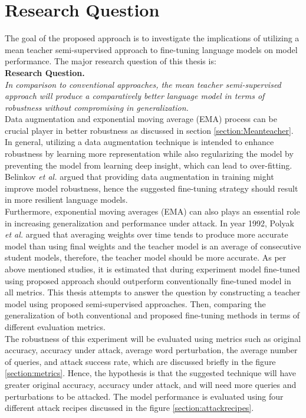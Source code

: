 \documentclass[%
	BCOR=8mm, %
	DIV=12,
	toc=bibliography, %
	toc=listof, %
	oneside, %
	egregdoesnotlikesansseriftitles, %
	]{scrbook}
\begin{document}
\section{Research Question}
\label{section:researchquestions}
The goal of the proposed approach is to investigate the implications of utilizing a mean teacher semi-supervised approach to fine-tuning language models on model performance.
The major research question of this thesis is: \\
\textbf{Research Question.}\\ \emph{In comparison to conventional approaches, the mean teacher semi-supervised approach will produce a comparatively better language model in terms of robustness without compromising in generalization.}\\
Data augmentation and exponential moving average (EMA) process can be crucial player in better robustness as discussed in section \ref{section:Meanteacher}. In general, utilizing a data augmentation technique is intended to enhance robustness by learning more representation while also regularizing the model by preventing the model from learning deep insight, which can lead to over-fitting. Belinkov \textit{et al.} \cite{belinkov_synthetic_2018} argued that providing data augmentation in training might improve model robustness, hence the suggested fine-tuning strategy should result in more resilient language models.\\
Furthermore, exponential moving averages (EMA) can also plays an essential role in increasing generalization and performance under attack. In year 1992, Polyak \textit{et al.} \cite{polyak_acceleration_1992} argued that averaging weights over time tends to produce more accurate model than using final weights and the teacher model is an average of consecutive student models, therefore, the teacher model should be more accurate. As per above mentioned studies, it is estimated that during experiment model fine-tuned using proposed approach should outperform conventionally fine-tuned model in all metrics. 
This thesis attempts to answer the question by constructing a teacher model using proposed semi-supervised approaches. Then, comparing the generalization of both conventional and proposed fine-tuning methods in terms of different evaluation metrics. \\
The robustness of this experiment will be evaluated using metrics such as original accuracy, accuracy under attack, average word perturbation, the average number of queries, and attack success rate, which are discussed briefly in the figure \ref{section:metrics}. Hence, the hypothesis is that the suggested technique will have greater original accuracy, accuracy under attack, and will need more queries and perturbations to be attacked. The model performance is evaluated using four different attack recipes discussed in the figure \ref{section:attackrecipes}.\\
\end{document}

